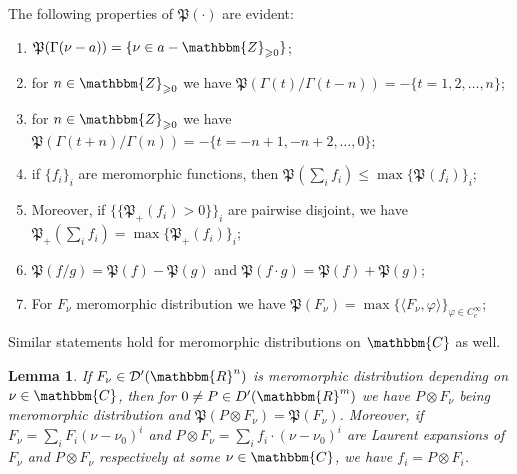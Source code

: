 \documentclass{article}
\newcommand{\nosymbol}{}
\numberwithin{definition}{section}
\newtheorem{lemma}{Lemma}
\numberwithin{lemma}{section}
\numberwithin{proposition}{section}
{\theorembodyfont{\rmfamily}\newtheorem{remark}{Remark}
\numberwithin{remark}{section}
}
\begin{document}
\begin{remark}
  \label{P-def:rem-def-P}The following properties of $\mathfrak{P} ( \cdot)$
  are evident:
  \begin{enumerate}
    \item $\mathfrak{P} ( \Gamma ( \nu - a)) = \{ \nu \in a
    -\mathbbm{Z}_{\geqslant 0} \}$;
    
    \item for $n \in \mathbbm{Z}_{\geqslant 0}$ we have $\mathfrak{P} ( \Gamma
    ( t) / \Gamma ( t - n)) = - \{ t = 1, 2, \ldots, n \}$;
    
    \item for $n \in \mathbbm{Z}_{\geqslant 0}$ we have $\mathfrak{P} ( \Gamma
    ( t + n) / \Gamma ( n)) = - \{ t = - n + 1, - n + 2, \ldots, 0 \}$;
    
    \item if $\{ f_i \}_i$ are meromorphic functions, then $\mathfrak{P}_{}
    \left( \sum_i f_i \right) \leqslant \max \{ \mathfrak{P}_{} ( f_i) \}_i
    \nosymbol$;
    
    \item Moreover, if $\{ \{ \mathfrak{P}_+ ( f_i) > 0 \} \}_i$ are pairwise
    disjoint, we have $\mathfrak{P}_+ \left( \sum_i f_i \right) = \max \{
    \mathfrak{P}_+ ( f_i) \}_i \nosymbol$;
    
    \item $\mathfrak{P} ( f / g) =\mathfrak{P} ( f) -\mathfrak{P} ( g)$ and
    $\mathfrak{P} ( f \cdot g) =\mathfrak{P} ( f) +\mathfrak{P} ( g)$;
    
    \item For $F_{\nu}$ meromorphic distribution we have $\mathfrak{P} (
    F_{\nu}) = \max \{ \langle F_{\nu}, \varphi \rangle \}_{\varphi \in
    C^{\infty}_c}$;
  \end{enumerate}
  Similar statements hold for meromorphic distributions on $\mathbbm{C}$ as
  well.
\end{remark}

\begin{lemma}
  \label{P-def:lem-delta-times-mero}If $F_{\nu} \in \mathcal{D}' (
  \mathbbm{R}^n)$ is meromorphic distribution depending on $\nu \in
  \mathbbm{C}$, then for $0 \neq P \in D' ( \mathbbm{R}^m)$ we have $P \otimes
  F_{\nu}$ being meromorphic distribution and $\mathfrak{P} ( P \otimes
  F_{\nu}) =\mathfrak{P} ( F_{\nu})$. Moreover, if $F_{\nu} = \sum_i F_i ( \nu
  - \nu_0)^i$ and $P \otimes F_{\nu} = \sum_i f_i \cdot ( \nu - \nu_0)^i$ are
  Laurent expansions of $F_{\nu}$ and $P \otimes F_{\nu}$ respectively at some
  $\nu \in \mathbbm{C}$, we have $f_i = P \otimes F_i$.
\end{lemma}
\end{document}
